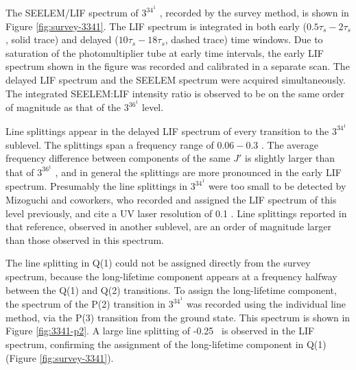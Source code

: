 \documentclass[12pt]{mitthesis}
\begin{document}

The SEELEM/LIF spectrum of $3^34^1$ , recorded by the survey
method, is shown in Figure \ref{fig:survey-3341}.  The LIF spectrum is
integrated in both early ($0.5\tau_s-2\tau_s$, solid trace) and
delayed ($10\tau_s-18\tau_s$, dashed trace) time windows.  Due to
saturation of the photomultiplier tube at early time intervals, the
early LIF spectrum shown in the figure was recorded and calibrated in
a separate scan.  The delayed LIF spectrum and the SEELEM spectrum
were acquired simultaneously.  The integrated SEELEM:LIF intensity
ratio is observed to be on the same order of magnitude as that of the
$3^36^1$  level.

Line splittings appear in the delayed LIF spectrum of every transition
to the $3^34^1$  sublevel.  The splittings span a frequency
range of $0.06-0.3$ \rcm.  The average frequency difference between
components of the same $J'$ is slightly larger than that of
$3^36^1$ , and in general the splittings are more pronounced in the early
LIF spectrum.  Presumably the line splittings in $3^34^1$  were
too small to be detected by Mizoguchi and coworkers, who recorded and
assigned the LIF spectrum of this level previously, and cite a UV
laser resolution of 0.1 \rcm \cite{mizoguchi00}.  Line splittings
reported in that reference, observed in another sublevel, are an order
of magnitude larger than those observed in this spectrum.

The line splitting in Q(1) could not be assigned directly from the
survey spectrum, because the long-lifetime component appears at a
frequency halfway between the Q(1) and Q(2) transitions.  To assign
the long-lifetime component, the spectrum of the P(2) transition in
$3^34^1$  was recorded using the individual line method, via the P(3)
transition from the ground state.  This spectrum is shown in Figure
\ref{fig:3341-p2}.  A large line splitting of -0.25 \rcm\ is observed
in the LIF spectrum, confirming the assignment of the long-lifetime
component in Q(1) (Figure \ref{fig:survey-3341}).

\end{document}
